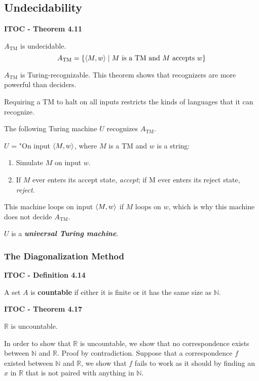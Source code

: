 \subsection{Undecidability}

\label{lang:ATM_TR}
\begin{shaded}
\textbf{ITOC - Theorem 4.11}

\medskip
$A_\text{TM}$ is undecidable.
\[
A_\text{TM} = \{\langle{M, w}\rangle \mid M \text{ is a TM and $M$ accepts $w$} \}
\]
\end{shaded}

$A_\text{TM}$ is Turing-recognizable. This theorem shows that recognizers are more powerful than deciders.

Requiring a TM to halt on all inputs restricts the kinds of languages that it can recognize.

The following Turing machine $U$ recognizes $A_\text{TM}$.

\medskip
$U$ = "On input $\langle{M, w}\rangle$, where $M$ is a TM and $w$ is a string:
\begin{enumerate}
\item Simulate $M$ on input $w$.
\item If $M$ ever enters its accept state, \textit{accept}; if M ever enters its reject state, \textit{reject}.
\end{enumerate}

This machine loops on input $\langle{M, w}\rangle$ if $M$ loops on $w$, which is why this machine does not decide $A_\text{TM}$.

$U$ is a \textbf{\textit{universal Turing machine}}.

\subsubsection{The Diagonalization Method}

\begin{shaded}
\textbf{ITOC - Definition 4.14}

\medskip
A set $A$ is \textbf{countable} if either it is finite or it has the same size as $\mathbb{N}$.
\end{shaded}

\begin{shaded}
\textbf{ITOC - Theorem 4.17}

\medskip
$\mathbb{R}$ is uncountable.
\end{shaded}

In order to show that $\mathbb{R}$ is uncountable, we show that no correspondence exists between $\mathbb{N}$ and $\mathbb{R}$. Proof by contradiction. Suppose that a correspondence $f$ existed between $\mathbb{N}$ and $\mathbb{R}$, we show that $f$ fails to work as it should by finding an $x$ in $\mathbb{R}$ that is not paired with anything in $\mathbb{N}$.


